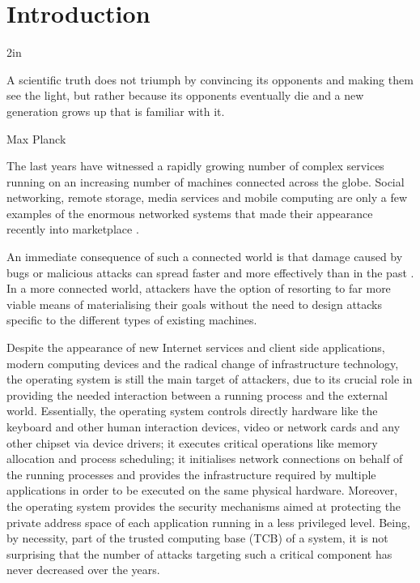 \chapter{Introduction}\label{intro:introduction}

\epigraph{2in}{A scientific truth does not triumph by convincing its opponents and making them see the light, but rather because its opponents eventually die and a new generation grows up that is familiar with it.}{Max Planck}{}


The last years have witnessed a rapidly growing number of complex services running on an increasing number of machines connected across the globe.
Social networking, remote storage, media services and mobile computing are only a few examples of the enormous networked systems that made their appearance recently into marketplace \cite{socialinternet, datta, measureinternet}.

An immediate consequence of such a connected world is that damage caused by bugs or malicious attacks 
can spread faster and more effectively than in the past \cite{DBLP:journals/corr/abs-1202-3987, DBLP:conf/ntms/FaghaniML12, Yan:2011:MPO:1966913.1966939}. In a more connected world, attackers have the option of resorting to far more viable means of materialising their goals without the need to design attacks specific to the different types of existing machines. 

Despite the appearance of new Internet services and client side applications, modern computing devices and the radical change of infrastructure technology, the operating system is still the main target of attackers, due to its crucial role in providing the needed interaction between a running process and the external world. 
Essentially, the operating system controls directly hardware like the keyboard and other human interaction devices, video or network cards and any other chipset via device drivers; it executes critical operations like memory allocation and process scheduling; it initialises network connections on behalf of the running processes and provides the infrastructure required by multiple applications in order to be executed on the same physical hardware. Moreover, the operating system provides the security mechanisms aimed at protecting the private address space of each application running in a less privileged level. 
Being, by necessity, part of the trusted computing base (TCB) of a system, it is not surprising that the number of attacks targeting such a critical component has never decreased over the years. 


